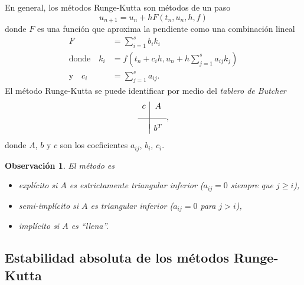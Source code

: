 \documentclass[11pt,letterpaper]{report}
\newtheorem{remark}{Observación}
\begin{document}
En general, los métodos Runge-Kutta son métodos de un paso
\begin{equation}
  u_{n+1} = u_n + h F(t_n,u_n,h,f)
\end{equation}
donde $F$ es una función que aproxima la pendiente como una
combinación lineal
\begin{align}
  F
    &=
    \sum_{i=1}^{s}b_ik_i
  \\[-3mm]
  \text{donde} \quad
  k_i
    &= f(t_n+c_ih, u_n+h \sum_{j=1}^{s}a_{ij} k_j)
    \\[-4mm]
  \text{y} \quad
  c_i
    &= \sum_{j=1}^{s}a_{ij}
.\end{align}
El método Runge-Kutta  se puede identificar por medio del
\emph{tablero de Butcher}
\begin{equation}
  \begin{array}{c|c}
    c & A \\[3mm]
    \hline \\[-2mm]
      & b^{T}
  \end{array}
,\end{equation}
donde $A$, $b$ y $c$ son los coeficientes $a_{ij}$, $b_i$, $c_i$.

\begin{remark}
  El método es
  \begin{itemize}
    \item
      explícito si $A$ es estrictamente triangular inferior
      ($a_{ij}=0$ siempre que $j\geq i$),
    \item
      semi-implícito si $A$ es triangular inferior ($a_{ij}=0$ para
      $j>i$),
    \item
      implícito si $A$ es ``llena''.
  \end{itemize}
\end{remark}

\subsection{Estabilidad absoluta de los métodos Runge-Kutta}
\end{document}
